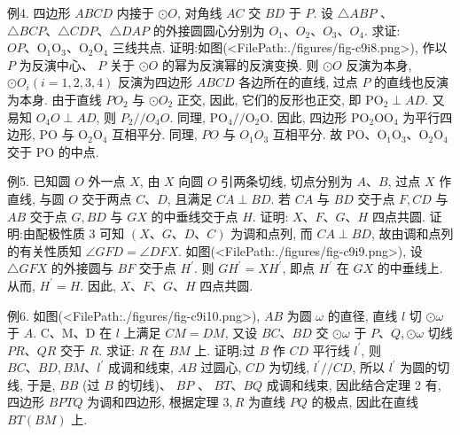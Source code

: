 例4. 四边形 $A B C D$ 内接于 $\odot O$, 对角线 $A C$ 交 $B D$ 于 $P$. 设 $\triangle A B P$ 、 $\triangle B C P 、 \triangle C D P 、 \triangle D A P$ 的外接圆圆心分别为 $O_1 、 O_2 、 O_3 、 O_4$. 求证: $O P 、 \mathrm{O}_1 \mathrm{O}_3 、 \mathrm{O}_2 \mathrm{O}_4$ 三线共点.
证明:如图(<FilePath:./figures/fig-c9i8.png>), 作以 $P$ 为反演中心、 $P$ 关于 $\odot O$ 的幂为反演幂的反演变换.
则 $\odot O$ 反演为本身, $\odot O_i (i=1,2,3,4)$ 反演为四边形 $A B C D$ 各边所在的直线, 过点 $P$ 的直线也反演为本身.
由于直线 $P O_2$ 与 $\odot O_2$ 正交, 因此, 它们的反形也正交, 即 $\mathrm{PO}_2 \perp A D$.
又易知 $O_4 O \perp A D$, 则 $P_2 / / O_4 O$.
同理, $\mathrm{PO}_4 / / \mathrm{O}_2 \mathrm{O}$.
因此, 四边形 $\mathrm{PO}_2 \mathrm{OO}_4$ 为平行四边形, $\mathrm{PO}$ 与 $\mathrm{O}_2 \mathrm{O}_4$ 互相平分.
同理, $P O$ 与 $O_1 O_3$ 互相平分.
故 $\mathrm{PO} 、 \mathrm{O}_1 \mathrm{O}_3 、 \mathrm{O}_2 \mathrm{O}_4$ 交于 $\mathrm{PO}$ 的中点.



例5. 已知圆 $O$ 外一点 $X$, 由 $X$ 向圆 $O$ 引两条切线, 切点分别为 $A 、 B$, 过点 $X$ 作直线, 与圆 $O$ 交于两点 $C 、 D$, 且满足 $C A \perp B D$. 若 $C A$ 与 $B D$ 交于点 $F, C D$ 与 $A B$ 交于点 $G, B D$ 与 $G X$ 的中垂线交于点 $H$. 证明: $X 、 F 、 G 、 H$ 四点共圆.
证明:由配极性质 3 可知 $(X 、 G 、 D 、 C)$ 为调和点列, 而 $C A \perp B D$, 故由调和点列的有关性质知 $\angle G F D=\angle D F X$.
如图(<FilePath:./figures/fig-c9i9.png>), 设 $\triangle G F X$ 的外接圆与 $B F$ 交于点 $H^{\prime}$. 则 $G H^{\prime}=X H^{\prime}$, 即点 $H^{\prime}$ 在 $G X$ 的中垂线上.
从而, $H^{\prime}=H$. 因此, $X 、 F 、 G 、 H$ 四点共圆.



例6. 如图(<FilePath:./figures/fig-c9i10.png>), $A B$ 为圆 $\omega$ 的直径, 直线 $l$ 切 $\odot \omega$ 于 $A$. C、M、D 在 $l$ 上满足 $C M=D M$, 又设 $B C 、 B D$ 交 $\odot \omega$ 于 $P 、 Q, \odot \omega$ 切线 $P R 、 Q R$ 交于 $R$. 求证: $R$ 在 $B M$ 上.
证明:过 $B$ 作 $C D$ 平行线 $l^{\prime}$, 则 $B C 、 B D, B M 、 l^{\prime}$ 成调和线束, $A B$ 过圆心, $C D$ 为切线, $l^{\prime} / / C D$, 所以 $l^{\prime}$ 为圆的切线, 于是, $B B$ (过 $B$ 的切线)、 $B P$ 、 $B T 、 B Q$ 成调和线束, 因此结合定理 2 有, 四边形 $B P T Q$ 为调和四边形, 根据定理 $3, R$ 为直线 $P Q$ 的极点, 因此在直线 $B T(B M)$ 上.



